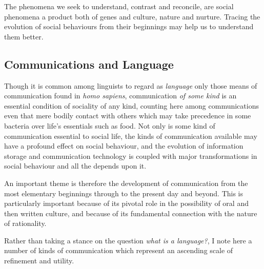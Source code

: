 \documentclass[10pt,titlepage]{book}
\begin{document}
The phenomena we seek to understand, contrast and reconcile, are social phenomena a product both of genes and culture, nature and nurture.
Tracing the evolution of social behaviours from their beginnings may help us to understand them better.

\subsection{Communications and Language}

Though it is common among linguists to regard as \emph{language} only those means of communication found in \emph{homo sapiens}, communication \emph{of some kind} is an essential condition of sociality of any kind, counting here among communications even that mere bodily contact with others which may take precedence in some bacteria over life's essentials such as food.
Not only is some kind of communication essential to social life, the kinds of communication available may have a profound effect on social behaviour, and the evolution of information storage and communication technology is coupled with major transformations in social behaviour and all the depends upon it.

An important theme is therefore the development of communication from the most elementary beginnings through to the present day and beyond.
This is particularly important because of its pivotal role in the possibility of oral and then written culture, and because of its fundamental connection with the nature of rationality.

Rather than taking a stance on the question \emph{what is a language?}, I note here a number of kinds of communication which represent an ascending scale of refinement and utility.
\end{document}
